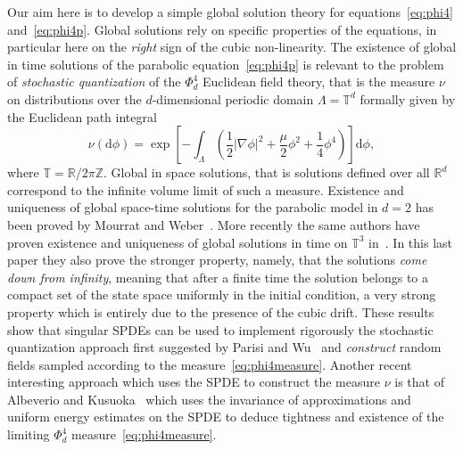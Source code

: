 \documentclass[a4paper,11pt]{article}
\newcommand{\mathd}{\mathrm{d}}
\numberwithin{equation}{section}
\newcommand{\R}{\mathbb{R}}
\newcommand{\8}{\infty}
\begin{document}
Our aim  here is to develop a simple global solution theory for equations~\eqref{eq:phi4} and~\eqref{eq:phi4p}. Global solutions rely on specific properties of the equations, in particular here on the \emph{right} sign of the cubic non-linearity. The existence of  global in time solutions of the parabolic equation~\eqref{eq:phi4p} is relevant to the problem of \emph{stochastic quantization} of the $\Phi^4_d$ Euclidean  field theory, that is the measure $\nu$ on distributions over the $d$-dimensional periodic domain $\Lambda=\mathbb{T}^d$ formally given by the Euclidean path integral
\begin{equation}
\label{eq:phi4measure}
\nu(\mathd \phi)= \exp\left[-\int_{\Lambda} \left(\frac12|\nabla \phi|^2+\frac{\mu}{2}\phi^2+\frac14\phi^4\right) \right] \mathd \phi,
\end{equation}
where $\mathbb{T}=\R/2\pi \mathbb{Z}$.
Global in space solutions, that is solutions defined over all $\R^d$ correspond to the infinite volume limit of such a measure. Existence and uniqueness of global space-time solutions for the parabolic model in $d=2$ has been proved by Mourrat and Weber~\cite{MW17}. More recently the same authors have proven existence and uniqueness of global solutions in time on $\mathbb{T}^3$ in~\cite{MWcomedown}. In this last paper they also prove the stronger property, namely, that the solutions \emph{come down from infinity}, meaning that after a finite time the solution belongs to a compact set of the state space uniformly in the initial condition, a very strong property which is entirely due to the presence of the  cubic drift. These results show that singular SPDEs can be used to implement rigorously  the stochastic quantization approach first suggested by Parisi and Wu~\cite{parisi_perturbation_1981} and \emph{construct} random fields sampled according to the measure~\eqref{eq:phi4measure}. Another recent interesting approach which uses the SPDE to construct the measure $\nu$ is that of Albeverio and Kusuoka~\cite{albeverio_invariant_2017} which uses the invariance of approximations and uniform energy estimates on the SPDE to deduce tightness and existence of the limiting $\Phi^4_d$ measure~\eqref{eq:phi4measure}. 
\end{document}
